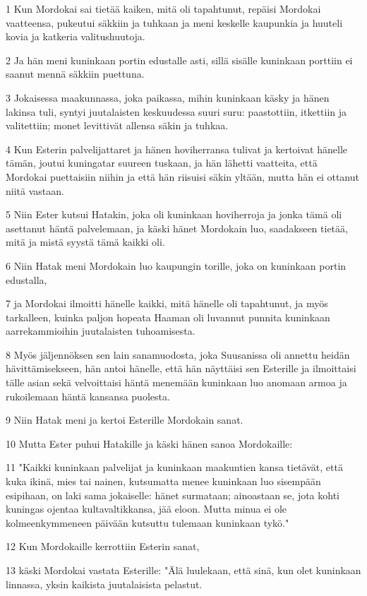 \par 1 Kun Mordokai sai tietää kaiken, mitä oli tapahtunut, repäisi Mordokai vaatteensa, pukeutui säkkiin ja tuhkaan ja meni keskelle kaupunkia ja huuteli kovia ja katkeria valitushuutoja.
\par 2 Ja hän meni kuninkaan portin edustalle asti, sillä sisälle kuninkaan porttiin ei saanut mennä säkkiin puettuna.
\par 3 Jokaisessa maakunnassa, joka paikassa, mihin kuninkaan käsky ja hänen lakinsa tuli, syntyi juutalaisten keskuudessa suuri suru: paastottiin, itkettiin ja valitettiin; monet levittivät allensa säkin ja tuhkaa.
\par 4 Kun Esterin palvelijattaret ja hänen hoviherransa tulivat ja kertoivat hänelle tämän, joutui kuningatar suureen tuskaan, ja hän lähetti vaatteita, että Mordokai puettaisiin niihin ja että hän riisuisi säkin yltään, mutta hän ei ottanut niitä vastaan.
\par 5 Niin Ester kutsui Hatakin, joka oli kuninkaan hoviherroja ja jonka tämä oli asettanut häntä palvelemaan, ja käski hänet Mordokain luo, saadakseen tietää, mitä ja mistä syystä tämä kaikki oli.
\par 6 Niin Hatak meni Mordokain luo kaupungin torille, joka on kuninkaan portin edustalla,
\par 7 ja Mordokai ilmoitti hänelle kaikki, mitä hänelle oli tapahtunut, ja myös tarkalleen, kuinka paljon hopeata Haaman oli luvannut punnita kuninkaan aarrekammioihin juutalaisten tuhoamisesta.
\par 8 Myös jäljennöksen sen lain sanamuodosta, joka Suusanissa oli annettu heidän hävittämisekseen, hän antoi hänelle, että hän näyttäisi sen Esterille ja ilmoittaisi tälle asian sekä velvoittaisi häntä menemään kuninkaan luo anomaan armoa ja rukoilemaan häntä kansansa puolesta.
\par 9 Niin Hatak meni ja kertoi Esterille Mordokain sanat.
\par 10 Mutta Ester puhui Hatakille ja käski hänen sanoa Mordokaille:
\par 11 "Kaikki kuninkaan palvelijat ja kuninkaan maakuntien kansa tietävät, että kuka ikinä, mies tai nainen, kutsumatta menee kuninkaan luo sisempään esipihaan, on laki sama jokaiselle: hänet surmataan; ainoastaan se, jota kohti kuningas ojentaa kultavaltikkansa, jää eloon. Mutta minua ei ole kolmeenkymmeneen päivään kutsuttu tulemaan kuninkaan tykö."
\par 12 Kun Mordokaille kerrottiin Esterin sanat,
\par 13 käski Mordokai vastata Esterille: "Älä luulekaan, että sinä, kun olet kuninkaan linnassa, yksin kaikista juutalaisista pelastut.
